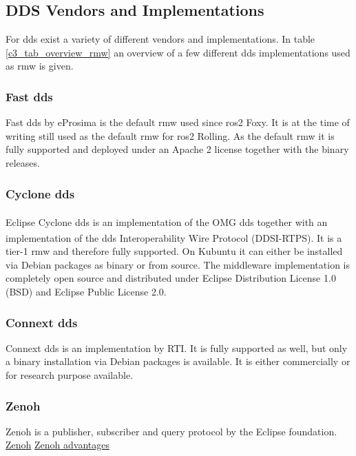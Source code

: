 \subsection{DDS Vendors and Implementations}
For \gls{dds} exist a variety of different vendors and implementations. In table \ref{c3_tab_overview_rmw} an overview of a few different \gls{dds} implementations used as \gls{rmw} is given.
\subsubsection*{Fast \gls{dds}}
Fast \gls{dds} by eProsima is the default \gls{rmw} used since \gls{ros2} Foxy. It is at the time of writing still used as the default \gls{rmw} for \gls{ros2} Rolling. As the default \gls{rmw} it is fully supported and deployed under an Apache 2 license together with the binary releases. \cite{noauthor_dds_nodate-1} 
\subsubsection*{Cyclone \gls{dds}}
Eclipse Cyclone \gls{dds}\textsuperscript{\texttrademark} is an implementation of the OMG \gls{dds} together with an implementation of the \gls{dds} Interoperability Wire Protocol (DDSI-RTPS\textsuperscript{\texttrademark}). It is a tier-1 \gls{rmw} and therefore fully supported. On Kubuntu it can either be installed via Debian packages as binary or from source. The middleware implementation is completely open source and distributed under Eclipse Distribution License 1.0 (BSD) and Eclipse Public License 2.0. \cite{anonymous_eclipse_2017, noauthor_eclipse_nodate}
\subsubsection*{Connext \gls{dds}}
Connext \gls{dds} is an implementation by RTI. It is fully supported as well, but only a binary installation via Debian packages is available. It is either commercially or for research purpose available. \cite{innovations_connext_nodate, noauthor_documentation_nodate}
\subsubsection*{Zenoh}
Zenoh is a publisher, subscriber and query protocol by the Eclipse foundation.
\href{https://www.adlinktech.com/en/Zenoh}{Zenoh} 
\href{https://zenoh.io/blog/2021-03-23-discovery/}{Zenoh advantages} 

